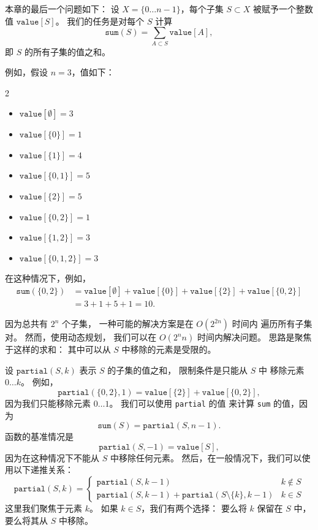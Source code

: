 本章的最后一个问题如下：
设 $X=\{0 \ldots n-1\}$，每个子集 $S \subset X$
被赋予一个整数值 $\texttt{value}[S]$。
我们的任务是对每个 $S$ 计算
\[\texttt{sum}(S) = \sum_{A \subset S} \texttt{value}[A],\]
即 $S$ 的所有子集的值之和。

例如，假设 $n=3$，值如下：
\begin{multicols}{2}
\begin{itemize}
\item $\texttt{value}[\emptyset] = 3$
\item $\texttt{value}[\{0\}] = 1$
\item $\texttt{value}[\{1\}] = 4$
\item $\texttt{value}[\{0,1\}] = 5$
\item $\texttt{value}[\{2\}] = 5$
\item $\texttt{value}[\{0,2\}] = 1$
\item $\texttt{value}[\{1,2\}] = 3$
\item $\texttt{value}[\{0,1,2\}] = 3$
\end{itemize}
\end{multicols}
在这种情况下，例如，
\begin{equation*}
\begin{split}
\texttt{sum}(\{0,2\}) &= \texttt{value}[\emptyset]+\texttt{value}[\{0\}]+\texttt{value}[\{2\}]+\texttt{value}[\{0,2\}] \\ 
                      &= 3 + 1 + 5 + 1 = 10.
\end{split}
\end{equation*}

因为总共有 $2^n$ 个子集，
一种可能的解决方案是在 $O(2^{2n})$ 时间内
遍历所有子集对。
然而，使用动态规划，
我们可以在 $O(2^n n)$ 时间内解决问题。
思路是聚焦于这样的求和：
其中可以从 $S$ 中移除的元素是受限的。

设 $\texttt{partial}(S,k)$ 表示 $S$ 的子集的值之和，
限制条件是只能从 $S$ 中
移除元素 $0 \ldots k$。
例如，
\[\texttt{partial}(\{0,2\},1)=\texttt{value}[\{2\}]+\texttt{value}[\{0,2\}],\]
因为我们只能移除元素 $0 \ldots 1$。
我们可以使用 \texttt{partial} 的值
来计算 \texttt{sum} 的值，因为
\[\texttt{sum}(S) = \texttt{partial}(S,n-1).\]
函数的基准情况是
\[\texttt{partial}(S,-1)=\texttt{value}[S],\]
因为在这种情况下不能从 $S$ 中移除任何元素。
然后，在一般情况下，我们可以使用以下递推关系：
\begin{equation*}
    \texttt{partial}(S,k) = \begin{cases}
               \texttt{partial}(S,k-1) & k \notin S \\
               \texttt{partial}(S,k-1) + \texttt{partial}(S \setminus \{k\},k-1) & k \in S
           \end{cases}
\end{equation*}
这里我们聚焦于元素 $k$。
如果 $k \in S$，我们有两个选择：
要么将 $k$ 保留在 $S$ 中，
要么将其从 $S$ 中移除。

